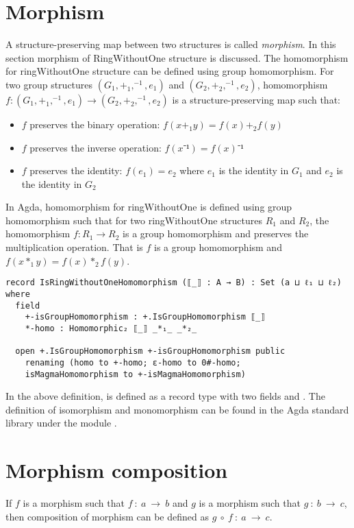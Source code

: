 \section{Morphism} 
A structure-preserving map between two structures is called \textit{morphism}.
In this section morphism of RingWithoutOne structure is discussed. The
homomorphism for ringWithoutOne structure can be defined using group
homomorphism. For two group structures $(G_1,+_1,^{-1},e_1)$ and
$(G_2,+_2,^{-1},e_2)$, homomorphism $f:(G_1,+_1,^{-1},e_1) \rightarrow
(G_2,+_2,^{-1},e_2)$ is a structure-preserving map such that:
\begin{itemize}
  \item $f$ preserves the binary operation: $f(x +_1 y) = f(x) +_2 f(y)$
  \item $f$ preserves the inverse operation: $f(x⁻¹) = f(x)⁻¹$
  \item $f$ preserves the identity: $f(e_1) = e_2$ where $e_1$ is the identity
  in $G_1$ and $e_2$ is the identity in $G_2$
\end{itemize}
In Agda, homomorphism for ringWithoutOne is defined using group homomorphism
such that for two ringWithoutOne structures $R_1$ and $R_2$, the homomorphism
$f: R_1 \rightarrow R_2$ is a group homomorphism and preserves the
multiplication operation. That is $f$ is a group homomorphism and \(f(x *_1 y) =
f(x) *_2 f(y)\).

\begin{verbatim}
record IsRingWithoutOneHomomorphism (⟦_⟧ : A → B) : Set (a ⊔ ℓ₁ ⊔ ℓ₂) where
  field
    +-isGroupHomomorphism : +.IsGroupHomomorphism ⟦_⟧
    *-homo : Homomorphic₂ ⟦_⟧ _*₁_ _*₂_

  open +.IsGroupHomomorphism +-isGroupHomomorphism public
    renaming (homo to +-homo; ε-homo to 0#-homo;
    isMagmaHomomorphism to +-isMagmaHomomorphism)
\end{verbatim} 

In the above definition,  is defined as a
record type with two fields  and .
The definition of isomorphism and monomorphism can be found in the Agda standard
library under the module .

\section{Morphism composition}
If $f$ is a morphism such that $f\ :\ a \ \rightarrow \ b$ and $g$ is a morphism
such that $g\ :\ b\ \rightarrow \ c$, then composition of morphism can be
defined as $g \ ∘\ f\ :\ a \ \rightarrow \ c$.

